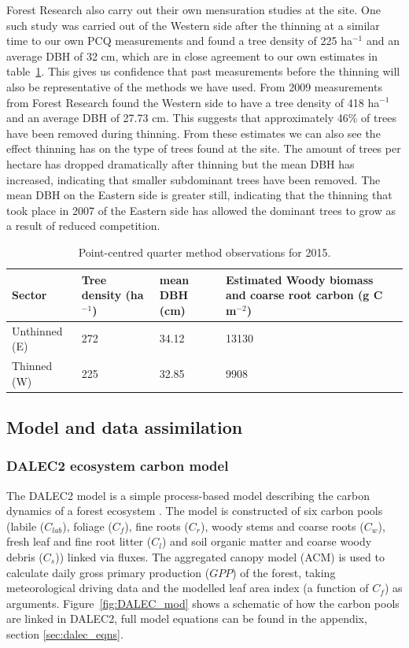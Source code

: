 \documentclass[11pt]{article}
\begin{document}
Forest Research also carry out their own mensuration studies at the site. One such study was carried out of the Western side after the thinning at a similar time to our own PCQ measurements and found a tree density of 225 ha\(^{-1}\) and an average DBH of 32 cm, which are in close agreement to our own estimates in table~\ref{table:cwoo_obs}. This gives us confidence that past measurements before the thinning will also be representative of the methods we have used. From 2009 measurements from Forest Research found the Western side to have a tree density of 418 ha\(^{-1}\) and an average DBH of 27.73 cm. This suggests that approximately 46\% of trees have been removed during thinning. From these estimates we can also see the effect thinning has on the type of trees found at the site. The amount of trees per hectare has dropped dramatically after thinning but the mean DBH has increased, indicating that smaller subdominant trees have been removed. The mean DBH on the Eastern side is greater still, indicating that the thinning that took place in 2007 of the Eastern side has allowed the dominant trees to grow as a result of reduced competition.

\begin{table}[ht] 
\begin{center}
	\begin{tabularx}{\textwidth}{| l | l | l | X |}
	\hline
	Sector & Tree density (ha\(^{-1}\)) & mean DBH (cm) & Estimated Woody biomass and coarse root carbon (g C m\(^{-2}\)) \\ \hline
	Unthinned (E) & 272 & 34.12 & 13130 \\ \hline
	Thinned (W) & 225 & 32.85 & 9908 \\ \hline
	\end{tabularx}
	\caption{Point-centred quarter method observations for 2015.}
	\label{table:cwoo_obs}
\end{center} 
\end{table}

\subsection{Model and data assimilation}
\subsubsection{DALEC2 ecosystem carbon model} \label{sec:dalec2}

The DALEC2 model is a simple process-based model describing the carbon dynamics of a forest ecosystem \citep{Bloom2015}. The model is constructed of six carbon pools (labile ($C_{lab}$), foliage ($C_f$), fine roots ($C_r$), woody stems and coarse roots ($C_w$), fresh leaf and fine root litter ($C_l$) and soil organic matter and coarse woody debris ($C_s$)) linked via fluxes. The aggregated canopy model (ACM) \citep{williams1997predicting} is used to calculate daily gross primary production ($GPP$) of the forest, taking meteorological driving data and the modelled leaf area index (a function of $C_f$) as arguments. Figure~\ref{fig:DALEC_mod} shows a schematic of how the carbon pools are linked in DALEC2, full model equations can be found in the appendix, section \ref{sec:dalec_eqns}.   
\end{document}
